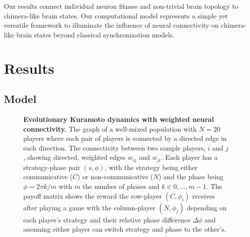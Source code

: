 \documentclass[pdflatex,lineno,referee,sn-nature]{sn-jnl}
\begin{document}
Our results connect individual neuron fitness and non-trivial brain topology
to chimera-like brain states.
Our computational model represents a simple yet versatile framework
to illuminate the influence of neural connectivity on chimera-like brain states
beyond classical synchronization models.

\section{Results}\label{sec:results}

\subsection{Model}
\begin{figure*}
  \centering
  \begin{nomemoize} %
    \begin{subcaptiongroup}
        {\label{fig:payoff_matrix}\captiontext*{}}{%
        {\label{fig:player_interactions}\captiontext*{}}{%
        {\label{fig:graph_well-mixed}\captiontext*{}}{%
      {}%
    }}}
    \end{subcaptiongroup}
  \end{nomemoize}
  \caption{
    \textbf{
      Evolutionary Kuramoto dynamics with weighted neural connectivity.
    }
    The graph of a well-mixed population with $N=20$ players
    where each pair of players is connected by a directed edge in each direction.
    The connectivity between two sample players, $i$ and $j$,
    showing directed, weighted edges $w_{ij}$ and $w_{ji}$.
    Each player has a strategy-phase pair $(s, \phi)$,
    with the strategy being either communicative ($C$) or non-communicative ($N$)
    and the phase being $\phi = 2\pi k/m$ with $m$ the number of phases
    and $k \in 0,\ldots,m-1$.
    The payoff matrix shows the reward the row-player $(C, \phi_i)$
    receives after playing a game with the column-player $(N, \phi_j)$
    depending on each player's strategy and
    their relative phase difference $\Delta \phi$
    and assuming either player can switch strategy and phase to the other's.
  }\label{fig:connectivity}
\end{figure*}
\end{document}
